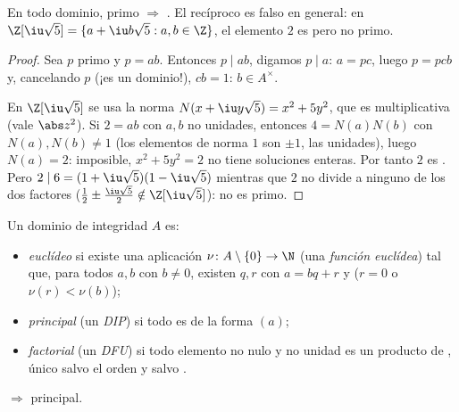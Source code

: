 \begin{proposition}\label{prop:b3:rings:primeirred}
En todo dominio, primo $\Rightarrow$
. El recíproco es falso
en general: en $\Z[\iu\sqrt 5] = \{a + \iu b\sqrt5 : a, b
\in \Z\}$, el elemento $2$ es
 pero no primo.
\end{proposition}

\begin{proof}
Sea $p$ primo y $p = ab$. Entonces $p \mid ab$, digamos $p \mid a$:
$a = pc$, luego $p = pcb$ y, cancelando $p$ (¡es un dominio!), $cb =
1$: $b \in A^\times$.

En $\Z[\iu\sqrt5]$ se usa la norma $N(x + \iu y\sqrt 5) = x^2 +
5y^2$, que es multiplicativa (vale $\abs z^2$). Si $2 = ab$ con $a, b$
no unidades, entonces $4 = N(a)N(b)$ con $N(a), N(b) \neq
1$ (los elementos de norma $1$ son $\pm1$, las unidades), luego
$N(a) = 2$: imposible, $x^2 + 5y^2 = 2$ no tiene soluciones enteras. Por
tanto $2$ es . Pero
$2 \mid 6 = (1 + \iu\sqrt5)(1 - \iu\sqrt5)$ mientras que $2$ no divide a
ninguno de los dos factores ($\frac12 \pm \frac{\iu\sqrt5}2
\notin \Z[\iu\sqrt5]$): no es primo.
\end{proof}

\begin{definition}\label{def:b3:rings:pidufd}
Un dominio de integridad $A$ es:
\begin{itemize}
  \item \emph{euclídeo} si existe una aplicación
  $\nu \colon A \setminus \{0\} \to \N$ (una \emph{función euclídea})
  tal que, para todos $a, b$ con $b \ne 0$, existen $q, r$ con
  $a = bq + r$ y ($r = 0$ o $\nu(r) <
        \nu(b)$); \item \emph{principal} (un \emph{DIP}) si todo  es de
  la forma $(a)$; \item \emph{factorial} (un \emph{DFU}) si todo elemento no nulo y no unidad es un
  producto de , único
  salvo el orden y salvo .
\end{itemize}
\end{definition}

\begin{theorem}\label{thm:b3:rings:euclideanpid}
 $\Rightarrow$ principal.
\end{theorem}

